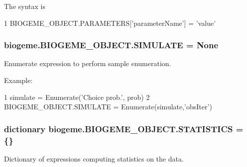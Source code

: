 The syntax is 
\begin{DoxyCode}
1 BIOGEME\_OBJECT.PARAMETERS[\textcolor{stringliteral}{'parameterName'}] = \textcolor{stringliteral}{'value'} 
\end{DoxyCode}
 \hypertarget{classbiogeme_1_1_b_i_o_g_e_m_e___o_b_j_e_c_t_ab1eb6d8235bf68d484b0a81eb7d41003}{
\subsubsection[{S\+I\+M\+U\+L\+A\+T\+E}]{\setlength{\rightskip}{0pt plus 5cm}biogeme.\+B\+I\+O\+G\+E\+M\+E\+\_\+\+O\+B\+J\+E\+C\+T.\+S\+I\+M\+U\+L\+A\+T\+E = None\hspace{0.3cm}{\ttfamily [static]}}}\label{classbiogeme_1_1_b_i_o_g_e_m_e___o_b_j_e_c_t_ab1eb6d8235bf68d484b0a81eb7d41003}


Enumerate expression to perform sample enumeration. 

Example\+: 
\begin{DoxyCode}
1 simulate = Enumerate(\textcolor{stringliteral}{'Choice prob.'}, prob)
2 BIOGEME\_OBJECT.SIMULATE = Enumerate(simulate,\textcolor{stringliteral}{'obsIter'}) 
\end{DoxyCode}
 \hypertarget{classbiogeme_1_1_b_i_o_g_e_m_e___o_b_j_e_c_t_a93741a718b3b53d9c9430bba5bab00f0}{
\subsubsection[{S\+T\+A\+T\+I\+S\+T\+I\+C\+S}]{\setlength{\rightskip}{0pt plus 5cm}dictionary biogeme.\+B\+I\+O\+G\+E\+M\+E\+\_\+\+O\+B\+J\+E\+C\+T.\+S\+T\+A\+T\+I\+S\+T\+I\+C\+S = \{\}\hspace{0.3cm}{\ttfamily [static]}}}\label{classbiogeme_1_1_b_i_o_g_e_m_e___o_b_j_e_c_t_a93741a718b3b53d9c9430bba5bab00f0}


Dictionary of expressions computing statistics on the data. 

